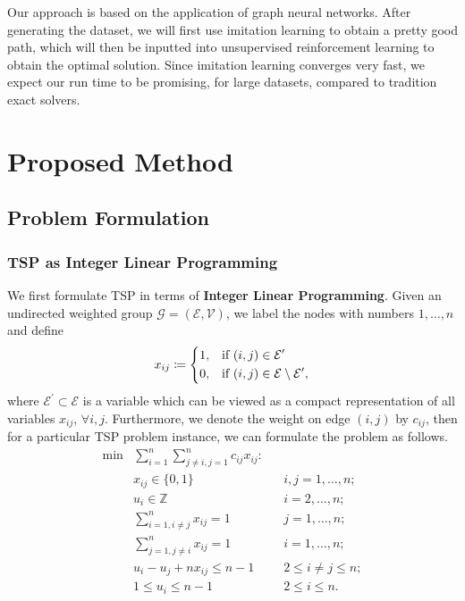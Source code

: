 \documentclass{article}
\begin{document}
Our approach is based on the application of graph neural networks. After generating the dataset, we will first use imitation learning to obtain a pretty good path, which will then be inputted into unsupervised
reinforcement learning to obtain the optimal solution. Since imitation learning converges very fast, we expect our run time to be promising, for large datasets, compared to tradition exact solvers.

\section{Proposed Method}
\subsection{Problem Formulation}
\subsubsection{TSP as Integer Linear Programming}
We first formulate TSP in terms of \textbf{Integer Linear Programming}. Given an undirected weighted group \(\mathcal{G} = (\mathcal{E}, \mathcal{V})\), we label the
nodes with numbers \(1, \ldots, n\) and define
\[
	x_{ij}\coloneqq \begin{dcases}
		1, & \text{if }(i, j)\in \mathcal{E}^\prime                       \\
		0, & \text{if } (i, j)\in \mathcal{E}\setminus\mathcal{E}^\prime,
	\end{dcases}
\]
where \(\mathcal{E}^\prime\subset \mathcal{E}\) is a variable which can be viewed as a compact representation of all variables \(x_{ij}\), \(\forall i, j\). Furthermore, we
denote the weight on edge \((i, j)\) by \(c_{ij}\), then for a particular TSP problem instance, we can formulate the problem as follows.
\begin{equation}\label{formula:TSP}
	\begin{aligned}
		\min & \sum _{i=1}^{n}\sum _{j\neq i,j=1}^{n}c_{ij}x_{ij}\colon &  &                      \\
		     & x_{ij}\in \{0,1\}                                        &  & i,j=1,\ldots ,n;     \\
		     & u_{i}\in \mathbb{Z}                                      &  & i=2,\ldots ,n;       \\
		     & \sum _{i=1,i\neq j}^{n}x_{ij}=1                          &  & j=1,\ldots ,n;       \\
		     & \sum _{j=1,j\neq i}^{n}x_{ij}=1                          &  & i=1,\ldots ,n;       \\
		     & u_{i}-u_{j}+nx_{ij}\leq n-1                              &  & 2\leq i\neq j\leq n; \\
		     & 1\leq u_{i}\leq n-1                                      &  & 2\leq i\leq n.
	\end{aligned}
\end{equation}
\end{document}
